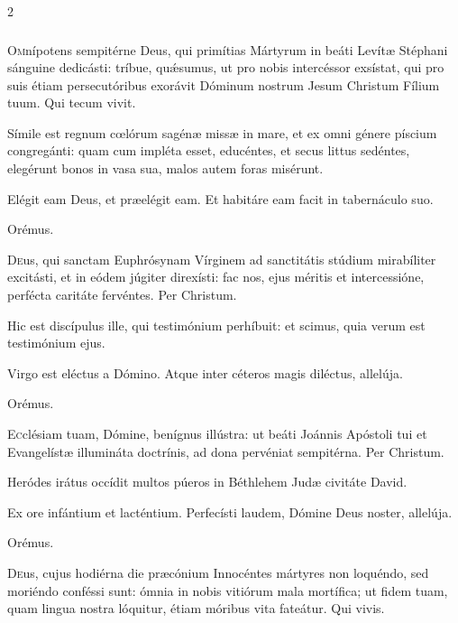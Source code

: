 \documentclass[9pt,twoside]{extarticle}
\begin{document}
\begin{multicols}{2}
\subsubsection*{\center {}}
\lettrine{O}mnípotens sempitérne Deus, qui primítias Mártyrum in beáti Levítæ Stéphani sánguine dedicásti: tríbue, quǽsumus, ut pro nobis intercéssor exsístat, qui pro suis étiam persecutóribus exorávit Dóminum nostrum Jesum Christum Fílium tuum. Qui tecum vivit.

\begin{tightlist}{}
\item {} Símile est regnum cœlórum sagénæ missæ in mare, et ex omni génere píscium congregánti: quam cum impléta esset, educéntes, et secus littus sedéntes, elegérunt bonos in vasa sua, malos autem foras misérunt.
\item {} Elégit eam Deus, et præelégit eam.  Et habitáre eam facit in tabernáculo suo.
\item Orémus. \hfill {}
\end{tightlist}
\lettrine{D}eus, qui sanctam Euphrósynam Vírginem ad sanctitátis stúdium mirabíliter excitásti, et in eódem júgiter direxísti: fac nos, ejus méritis et intercessióne, perfécta caritáte fervéntes. Per Christum.

\begin{tightlist}{}
\item {} Hic est discípulus ille, qui testimónium perhíbuit: et scimus, quia verum est testimónium ejus.
\item {} Virgo est eléctus a Dómino.  Atque inter céteros magis diléctus, allelúja.
\item Orémus. \hfill {}
\end{tightlist}
\lettrine{E}cclésiam tuam, Dómine, benígnus illústra: ut beáti Joánnis Apóstoli tui et Evangelístæ illumináta doctrínis, ad dona pervéniat sempitérna. Per Christum.


\begin{tightlist}{}
\item {} Heródes irátus occídit multos púeros in Béthlehem Judæ civitáte David.
\item {} Ex ore infántium et lacténtium.  Perfecísti laudem, Dómine Deus noster, allelúja.
\item Orémus. \hfill {}
\end{tightlist}
\lettrine{D}eus, cujus hodiérna die præcónium Innocéntes mártyres non loquéndo, sed moriéndo conféssi sunt: ómnia in nobis vitiórum mala mortífica; ut fidem tuam, quam lingua nostra lóquitur, étiam móribus vita fateátur. Qui vivis.



\end{multicols}
\end{document}

